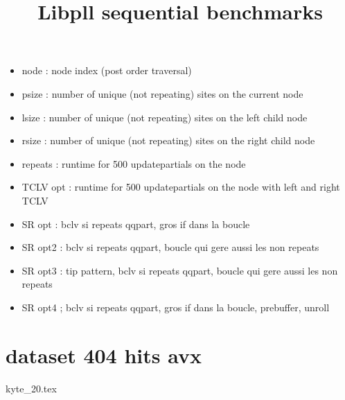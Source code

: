 \documentclass[a4paper]{article}
\begin{document}
\newcommand*{\figuretitle}[1]{%
    {\centering%
    \textbf{#1}%
    \par\medskip}%
}


\title{Libpll sequential benchmarks}
\maketitle


\begin{itemize}
\item node : node index (post order traversal)
\item psize : number of unique (not repeating) sites on the current node
\item lsize : number of unique (not repeating) sites on the left child node
\item rsize : number of unique (not repeating) sites on the right child node
\item repeats : runtime for 500 updatepartials on the node
\item TCLV opt : runtime for 500 updatepartials on the node with left and right TCLV
\end{itemize}



\begin{itemize}
\item SR opt : bclv si repeats qqpart, gros if dans la boucle
\item SR opt2 :  bclv si repeats qqpart, boucle qui gere aussi les non repeats
\item SR opt3 : tip pattern, bclv si repeats qqpart, boucle qui gere aussi les non repeats
\item SR opt4 ; bclv si repeats qqpart, gros if dans la boucle, prebuffer, unroll
\end{itemize}


\section{dataset 404 hits avx}
%
{kyte_20.tex}
\end{document}
